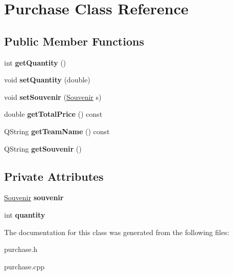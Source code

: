 \hypertarget{class_purchase}{}\section{Purchase Class Reference}
\label{class_purchase}
\subsection*{Public Member Functions}
\begin{DoxyCompactItemize}
\item 
\mbox{\label{class_purchase_affdd7456d399278a348ae2e26f8928dd}} 
int {\bfseries get\+Quantity} ()
\item 
\mbox{\label{class_purchase_ad5dc255665b0986b11da43ad6ce06b3c}} 
void {\bfseries set\+Quantity} (double)
\item 
\mbox{\label{class_purchase_a26156457fb62097acd3341d7f8e2d14d}} 
void {\bfseries set\+Souvenir} (\hyperlink{class_souvenir}{Souvenir} s)
\item 
\mbox{\label{class_purchase_a49adb5a9c4c972faef2bb0dfbfd9327c}} 
double {\bfseries get\+Total\+Price} () const
\item 
\mbox{\label{class_purchase_aae64c12f19f832c742ae036ab0785d89}} 
Q\+String {\bfseries get\+Team\+Name} () const
\item 
\mbox{\label{class_purchase_a49f7cf68192e2bb37faa394cde681ee9}} 
Q\+String {\bfseries get\+Souvenir} ()
\end{DoxyCompactItemize}
\subsection*{Private Attributes}
\begin{DoxyCompactItemize}
\item 
\mbox{\label{class_purchase_ad5c7f4e47489000e1514211b7d219fe7}} 
\hyperlink{class_souvenir}{Souvenir} {\bfseries souvenir}
\item 
\mbox{\label{class_purchase_a2ba21ff1de4cec6e51acad3d6a92d73a}} 
int {\bfseries quantity}
\end{DoxyCompactItemize}


The documentation for this class was generated from the following files\+:\begin{DoxyCompactItemize}
\item 
purchase.\+h\item 
purchase.\+cpp\end{DoxyCompactItemize}

